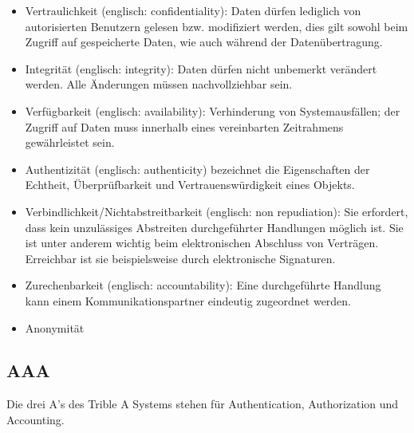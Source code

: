 \begin{itemize}
\item Vertraulichkeit (englisch: confidentiality): Daten dürfen lediglich von autorisierten Benutzern gelesen bzw. modifiziert werden, dies gilt sowohl beim Zugriff auf gespeicherte Daten, wie auch während der Datenübertragung.
\item Integrität (englisch: integrity): Daten dürfen nicht unbemerkt verändert werden. Alle Änderungen müssen nachvollziehbar sein.
\item Verfügbarkeit (englisch: availability): Verhinderung von Systemausfällen; der Zugriff auf Daten muss innerhalb eines vereinbarten Zeitrahmens gewährleistet sein.
\item Authentizität (englisch: authenticity) bezeichnet die Eigenschaften der Echtheit, Überprüfbarkeit und Vertrauenswürdigkeit eines Objekts.
\item Verbindlichkeit/Nichtabstreitbarkeit (englisch: non repudiation): Sie erfordert, dass kein unzulässiges Abstreiten durchgeführter Handlungen möglich ist. Sie ist unter anderem wichtig beim elektronischen Abschluss von Verträgen. Erreichbar ist sie beispielsweise durch elektronische Signaturen.
\item Zurechenbarkeit (englisch: accountability): Eine durchgeführte Handlung kann einem Kommunikationspartner eindeutig zugeordnet werden.
\item Anonymität
\end{itemize}

\subsection{AAA}
Die drei A's des Trible A Systems stehen für Authentication, Authorization und Accounting. 